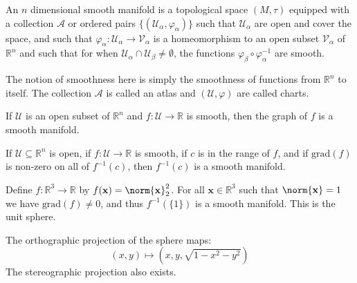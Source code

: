         \begin{definition}
            An $n$ dimensional smooth manifold is a topological space $(M,\tau)$
            equipped with a collection $\mathcal{A}$ or ordered pairs
            $\{(\mathcal{U}_{\alpha},\varphi_{\alpha})\}$ such that
            $\mathcal{U}_{\alpha}$ are open and cover the space, and such that
            $\varphi_{\alpha}:\mathcal{U}_{\alpha}\rightarrow\mathcal{V}_{\alpha}$
            is a homeomorphism to an open subset $\mathcal{V}_{\alpha}$ of
            $\mathbb{R}^{n}$ and such that for when
            $\mathcal{U}_{\alpha}\cap\mathcal{U}_{\beta}\ne\emptyset$, the
            functions $\varphi_{\beta}\circ\varphi_{\alpha}^{\minus{1}}$
            are smooth.
        \end{definition}
        The notion of smoothness here is simply the smoothness of functions
        from $\mathbb{R}^{n}$ to itself. The collection $\mathcal{A}$ is called
        an atlas and $(\mathcal{U},\varphi)$ are called charts.
        \begin{example}
            If $\mathcal{U}$ is an open subset of $\mathbb{R}^{n}$ and
            $f:\mathcal{U}\rightarrow\mathbb{R}$ is smooth, then the
            graph of $f$ is a smooth manifold.
        \end{example}
        \begin{example}
            If $\mathcal{U}\subseteq\mathbb{R}^{n}$ is open, if
            $f:\mathcal{U}\rightarrow\mathbb{R}$ is smooth, if $c$ is in the
            range of $f$, and if $\textrm{grad}(f)$ is non-zero on all of
            $f^{\minus{1}}(c)$, then $f^{\minus{1}}(c)$ is a smooth manifold.
        \end{example}
        \begin{example}
            Define $f:\mathbb{R}^{3}\rightarrow\mathbb{R}$ by
            $f(\mathbf{x})=\norm{\mathbf{x}}_{2}^{2}$. For all
            $\mathbf{x}\in\mathbb{R}^{3}$ such that $\norm{\mathbf{x}}=1$ we
            have $\textrm{grad}(f)\ne{0}$, and thus $f^{\minus{1}}(\{1\})$ is a
            smooth manifold. This is the unit sphere.
        \end{example}
        \begin{example}
            The orthographic projection of the sphere maps:
            \begin{equation}
                (x,y)\mapsto(x,y,\sqrt{1-x^{2}-y^{2}})
            \end{equation}
            The stereographic projection also exists.
        \end{example}
